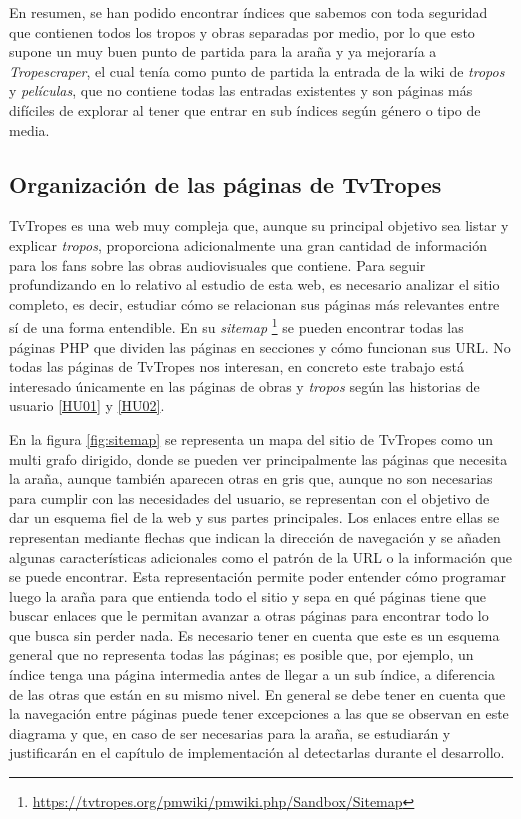 En resumen, se han podido encontrar índices que sabemos con toda seguridad que
contienen todos los tropos y obras separadas por medio, por lo que esto supone
un muy buen punto de partida para la araña y ya mejoraría a
\textit{Tropescraper}, el cual tenía como punto de partida la entrada de la wiki
de \textit{tropos} y \textit{películas}, que no contiene todas las entradas
existentes y son páginas más difíciles de explorar al tener que entrar en sub
índices según género o tipo de media.

\subsection{Organización de las páginas de TvTropes}

TvTropes es una web muy compleja que, aunque su principal objetivo sea listar y
explicar \textit{tropos}, proporciona adicionalmente una gran cantidad de
información para los fans sobre las obras audiovisuales que contiene. Para
seguir profundizando en lo relativo al estudio de esta web, es necesario
analizar el sitio completo, es decir, estudiar cómo se relacionan sus páginas
más relevantes entre sí de una forma entendible. En su
\textit{sitemap}
\footnote{\url{https://tvtropes.org/pmwiki/pmwiki.php/Sandbox/Sitemap}} se
pueden encontrar todas las páginas PHP que dividen las páginas en secciones y
cómo funcionan sus URL. No todas las páginas de TvTropes nos interesan, en
concreto este trabajo está interesado únicamente en las páginas de obras y
\textit{tropos} según las historias de usuario
\href{https://github.com/jlgallego99/TropesToGo/issues/6}{[HU01]} y
\href{https://github.com/jlgallego99/TropesToGo/issues/7}{[HU02]}.

En la figura \ref{fig:sitemap} se representa un mapa del sitio de TvTropes como
un multi grafo dirigido, donde se pueden ver principalmente las páginas que
necesita la araña, aunque también aparecen otras en gris que, aunque no son
necesarias para cumplir con las necesidades del usuario, se representan con el
objetivo de dar un esquema fiel de la web y sus partes principales. Los enlaces
entre ellas se representan mediante flechas que indican la dirección de
navegación y se añaden algunas características adicionales como el patrón de la
URL o la información que se puede encontrar. Esta representación permite poder
entender cómo programar luego la araña para que entienda todo el sitio y sepa en
qué páginas tiene que buscar enlaces que le permitan avanzar a otras páginas
para encontrar todo lo que busca sin perder nada. Es necesario tener en cuenta
que este es un esquema general que no representa todas las páginas; es posible
que, por ejemplo, un índice tenga una página intermedia antes de llegar a un sub
índice, a diferencia de las otras que están en su mismo nivel. En general se
debe tener en cuenta que la navegación entre páginas puede tener excepciones a
las que se observan en este diagrama y que, en caso de ser necesarias para la
araña, se estudiarán y justificarán en el capítulo de implementación al
detectarlas durante el desarrollo.

